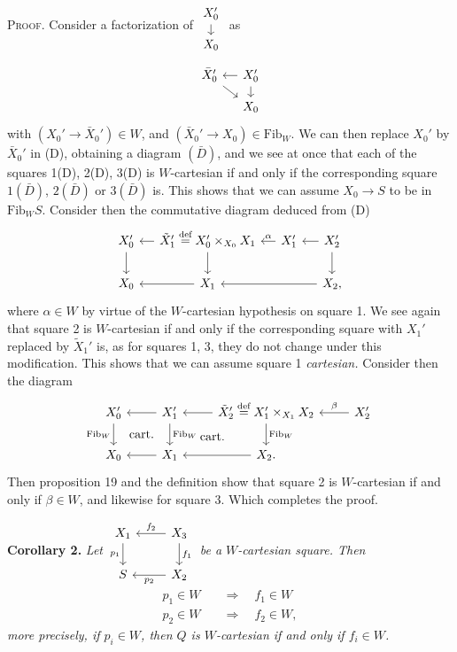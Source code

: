 \documentclass[11pt]{article}
\newcommand{\printedpage}[1]{\marginpar{\footnotesize p.~#1}}
\newcommand{\msp}[1]{\marginpar{\footnotesize [#1]}}
\newcommand{\Fib}{\mathrm{Fib}}
\begin{document}
\textsc{Proof}. Consider a factorization of $\begin{tikzcd}[ampersand replacement=\&, row sep=small] X_0' \arrow[d] \\ X_0 \end{tikzcd}$ as
\[
\begin{tikzcd}[ampersand replacement=\&, column sep=small, row sep=small]
\bar{X}_0' \arrow[dr] \& X_0' \arrow[l] \arrow[d] \\
\& X_0
\end{tikzcd}
\]
with $(X_0'\longrightarrow\bar{X}_0')\in W$, and $(\bar{X}_0'\longrightarrow X_0)\in\Fib_W$. We can then replace $X_0'$ by $\bar{X}_0'$ in (D), obtaining a diagram $(\bar{D})$, and we see at once
\printedpage{169}
\msp{page 260}
that each of the squares 1(D), 2(D), 3(D) is $W$-cartesian if and only if the corresponding square $1(\bar{D})$, $2(\bar{D})$ or $3(\bar{D})$ is. This shows that we can assume $X_0\longrightarrow S$ to be in $\Fib_W S$. Consider then the commutative diagram deduced from (D)
\[
\begin{tikzcd}[ampersand replacement=\&, column sep=small]
X_0' \arrow[d] \& \tilde{X}_1'\overset{\text{def}}{=}X_0'\times_{X_0}X_1 \arrow[l] \arrow[d] \& X_1' \arrow[l, "\alpha"'] \& X_2' \arrow[l] \arrow[d] \\
X_0 \& X_1 \arrow[l] \& \& X_2, \arrow[ll]
\end{tikzcd}
\]
where $\alpha\in W$ by virtue of the $W$-cartesian hypothesis on square 1. We see again that square 2 is $W$-cartesian if and only if the corresponding square with $X_1'$ replaced by $\tilde{X}_1'$ is, as for squares 1, 3, they do not change under this modification. This shows that we can assume square 1 \textit{cartesian.} Consider then the diagram
\[
\begin{tikzcd}[ampersand replacement=\&]
X_0' \arrow[d, "\mathrm{Fib}_W"'] \& X_1' \arrow[l] \arrow[d, "\mathrm{Fib}_W"] \arrow[dl, phantom, "\text{cart.}"] \& \tilde{X}_2'\overset{\text{def}}{=}X_1'\times_{X_1}X_2 \arrow[l] \arrow[d, "\mathrm{Fib}_W"] \arrow[dl, phantom, "\text{cart.}"] \& X_2' \arrow[l, "\beta"'] \\
X_0 \& X_1 \arrow[l] \& X_2. \arrow[l]
\end{tikzcd}
\]
Then proposition 19 and the definition show that square 2 is $W$-cartesian if and only if $\beta\in W$, and likewise for square 3. Which completes the proof. %

\textbf{Corollary 2.} \textit{Let $\begin{tikzcd}[ampersand replacement=\&] X_1 \arrow[d, "p_1"'] \& X_3 \arrow[l, "f_2"'] \arrow[d, "f_1"] \\ S \& X_2 \arrow[l, "p_2"] \end{tikzcd}$ be a $W$-cartesian square. Then}
\[
\begin{aligned}
p_1\in W\quad&\Longrightarrow\quad f_1\in W\\
p_2\in W\quad&\Longrightarrow\quad f_2\in W,
\end{aligned}
\]
\textit{more precisely, if $p_i\in W$, then $Q$ is $W$-cartesian if and only if $f_i\in W$.}
\end{document}
